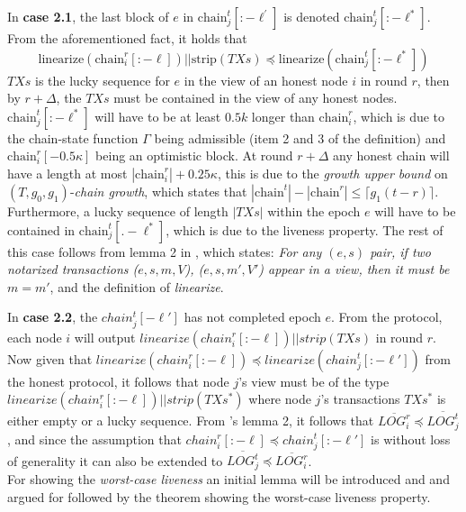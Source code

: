 In \textbf{case 2.1}, the last block of $e$ in $\text{chain}_j^t[:-\ell^{'}]$ is denoted $\text{chain}_j^t[:-\ell^{*}]$. From the aforementioned fact, it holds that
\begin{equation*}
    \text{linearize}(\text{chain}_i^r[:-\ell])||\text{strip}(TXs) \preceq \text{linearize}(\text{chain}_j^t[:-\ell^{*}])
\end{equation*}
$TXs$ is the lucky sequence for $e$ in the view of an honest node $i$ in round $r$, then by $r+\Delta$, the $TXs$ must be contained in the view of any honest nodes. $\text{chain}^t_j[:-\ell^{*}]$ will have to be at least $0.5k$ longer than $\text{chain}^r_i$, which is due to the chain-state function $\Gamma$ being admissible (item 2 and 3 of the definition) and $\text{chain}^r_i[-0.5\kappa]$ being an optimistic block. At round $r+\Delta$ any honest chain will have a length at most $|\text{chain}^r_i|+0.25\kappa$, this is due to the \emph{growth upper bound} on $(T,g_0,g_1)$-\emph{chain growth}, which states that $|\text{chain}^t|-|\text{chain}^r| \leq \lceil g_1(t-r) \rceil$. Furthermore, a lucky sequence of length $|TXs|$ within the epoch $e$ will have to be contained in $\text{chain}^t_j[.-\ell^{*}]$, which is due to the liveness property. The rest of this case follows from lemma 2 in \cite{thunderella}, which states: \emph{For any $(e, s)$ pair, if two notarized transactions ($e,s,m, V$), ($e, s, m', V'$) appear in a view, then it must be $m=m'$}, and the definition of \emph{linearize}.

In \textbf{case 2.2}, the $chain^t_j[-\ell']$ has not completed epoch $e$. From the protocol, each node $i$ will output $linearize(chain^r_i[:-\ell])||strip(TXs)$ in round $r$. Now given that $linearize(chain^r_i[:-\ell]) \preceq linearize(chain^t_j[:-\ell'])$ from the honest protocol, it follows that node $j$'s view must be of the type $linearize(chain^r_i[:-\ell])||strip(TXs^*)$ where node $j$'s transactions $TXs^*$ is either empty or a lucky sequence. From \cite{thunderella}'s lemma 2, it follows that $\overline{LOG^r_i} \preceq \overline{LOG^t_j}$, and since the assumption that $chain^r_i[:-\ell] \preceq chain^t_j[:-\ell']$ is without loss of generality it can also be extended to $\overline{LOG^t_j} \preceq \overline{LOG^r_i}$. \\

For showing the \emph{worst-case liveness} an initial lemma will be introduced and and argued for followed by the theorem showing the worst-case liveness property.

